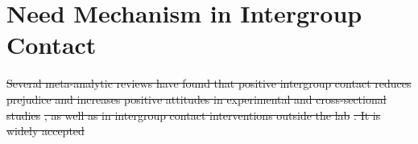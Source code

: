 \documentclass[man, 12pt, a4paper, mask]{apa7}
\theoremstyle{break}
\theoremstyle{plain}
\providecommand{\DIFdeltex}[1]{{\protect\color{red}\sout{#1}}}                      %
\providecommand{\DIFdelbegin}{} %
\providecommand{\DIFdelend}{} %
\providecommand{\DIFdel}[1]{\texorpdfstring{\DIFdeltex{#1}}{}} %
\newcommand{\DIFscaledelfig}{0.5}
\newlength{\DIFdelgraphicswidth} %
\newlength{\DIFdelgraphicsheight} %
\newcommand{\DIFdelincludegraphics}[2][]{%
\sbox{\DIFdelgraphicsbox}{\DIFOincludegraphics[#1]{#2}}%
\settoboxwidth{\DIFdelgraphicswidth}{\DIFdelgraphicsbox} %
\settoboxtotalheight{\DIFdelgraphicsheight}{\DIFdelgraphicsbox} %
\scalebox{\DIFscaledelfig}{%
\parbox[b]{\DIFdelgraphicswidth}{\usebox{\DIFdelgraphicsbox}\\[-\baselineskip] \rule{\DIFdelgraphicswidth}{0em}}\llap{\resizebox{\DIFdelgraphicswidth}{\DIFdelgraphicsheight}{%
\setlength{\unitlength}{\DIFdelgraphicswidth}%
\begin{picture}(1,1)%
\thicklines\linethickness{2pt} %
{\color[rgb]{1,0,0}\put(0,0){\framebox(1,1){}}}%
{\color[rgb]{1,0,0}\put(0,0){\line( 1,1){1}}}%
{\color[rgb]{1,0,0}\put(0,1){\line(1,-1){1}}}%
\end{picture}%
}\hspace*{3pt}}} %
} %
\DeclareRobustCommand{\DIFdelbegin}{\DIFOdelbegin \let\includegraphics\DIFdelincludegraphics} %
\DeclareRobustCommand{\DIFdelend}{\DIFOaddend \let\includegraphics\DIFOincludegraphics} %
\begin{document}
\section{Need Mechanism in Intergroup Contact}
\DIFdelbegin \DIFdel{Several meta-analytic reviews have found that positive intergroup contact reduces prejudice and increases positive attitudes in experimental and cross-sectional studies }%
\DIFdel{, as well as in intergroup contact interventions outside the lab }%
\DIFdel{. It is widely accepted }\DIFdelend %
\end{document}
